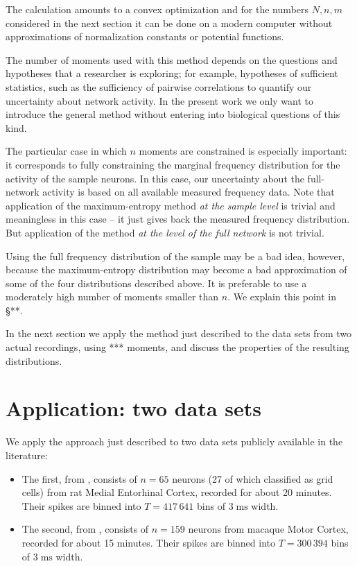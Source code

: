 \documentclass[\ifafour a4paper,12pt,\else a5paper,10pt,\fi%
onecolumn,oneside,article,%
british%
]{memoir}
\theoremstyle{remark}
\theoremstyle{innote}
\newcommand*{\citep}{\parencites}
\renewcommand*{\|}{\nonscript\,\vert\nonscript\;\mathopen{}}
\newcommand*{\sect}{\S}%
\newcommand*{\chap}{ch.}%
\begin{document}
The calculation amounts to a convex optimization
\citep{meadetal1984}[\chap~10]{pressetal1988_r2007}{fangetal1997,boydetal2004_r2009,portamana2017b}
and for the numbers $N,n,m$ considered in the next section it can be done
on a modern computer without approximations of normalization constants or
potential functions.

\bigskip

The number of moments used with this method depends on the questions and
hypotheses that a researcher is exploring; for example, hypotheses of
sufficient statistics, such as the sufficiency of pairwise correlations to
quantify our uncertainty about network activity. In the present work we
only want to introduce the general method without entering into biological
questions of this kind.

The particular case in which $n$ moments are constrained is especially
important: it corresponds to fully constraining the marginal frequency
distribution for the activity of the sample neurons. In this case, our
uncertainty about the full-network activity is based on all available
measured frequency data. Note that application of the maximum-entropy
method \emph{at the sample level} is trivial and meaningless in this case
-- it just gives back the measured frequency distribution. But application
of the method \emph{at the level of the full network} is not trivial.

Using the full frequency distribution of the sample may be a bad idea,
however, because the maximum-entropy distribution may become a bad
approximation of some of the four distributions described above. It is
preferable to use a moderately high number of moments smaller than $n$. We
explain this point in \sect***.

\bigskip

In the next section we apply the method just described to the data sets
from two actual recordings, using *** moments, and discuss the properties
of the resulting distributions.

\section{Application: two data sets}
\label{sec:application}

We apply the approach just described to two data sets publicly available in
the literature:
\begin{itemize}[wide]
\item The first, from \textcite[rat 14147]{stensolaetal2012},
  consists of $n=65$ neurons (27 of which classified as grid cells) from
  rat Medial Entorhinal Cortex, recorded for about 20 minutes. Their spikes
  are binned into $T=417\,641$ bins of $3\;\textrm{ms}$ width.
\item The second, from
  \textcite{rostamietal2016_r2017}, %
  consists of $n=159$ neurons from macaque Motor Cortex, recorded for about
  15 minutes. Their spikes are binned into $T=300\,394$ bins of
  $3\;\textrm{ms}$ width.
\end{itemize}
\end{document}

